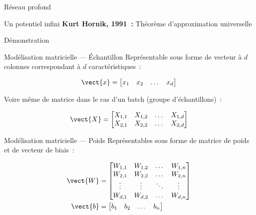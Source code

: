 \begin{frame}{Réseau profond}
  \centering
\end{frame}

\begin{frame}{Un potentiel infini}
  \textbf{Kurt Hornik, 1991~:} Théorème d'approximation universelle
\end{frame}

\begin{frame}{Démonstration}
\end{frame}

\begin{frame}{Modélisation matricielle --- Échantillon}
  Représentable sous forme de vecteur à $d$ colonnes correspondant à $d$ caractéristiques~:

  \[
    \vect{x} = \begin{bmatrix}
      x_1 & x_2 & \dots & x_d
    \end{bmatrix}
  \]

  Voire même de matrice dans le cas d'un batch (groupe d'échantillons)~:

  \[
    \vect{X} = \begin{bmatrix}
      X_{1,1} & X_{1,2} & \dots & X_{1,d} \\
      X_{2,1} & X_{2,2} & \dots & X_{2,d}
    \end{bmatrix}
  \]
\end{frame}

\begin{frame}{Modélisation matricielle --- Poids}
  Représentables sous forme de matrice de poids et de vecteur de biais~:

  \begin{align*}
    \vect{W} & = \begin{bmatrix}
      W_{1,1} & W_{1,2} & \dots  & W_{1,n} \\
      W_{2,1} & W_{2,2} & \dots  & W_{2,n} \\
      \vdots & \vdots & \ddots & \vdots \\
      W_{d,1} & W_{d,2} & \dots  & W_{d,n}
    \end{bmatrix} \\
    \vect{b} & = \begin{bmatrix}
      b_1 & b_2 & \dots & b_n
    \end{bmatrix}
  \end{align*}
\end{frame}

